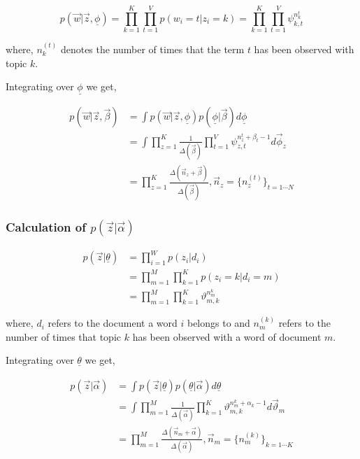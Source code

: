 \begin{equation}\label{eqn:wgivenpsi}
 p(\vec{w}|\vec{z},\underline{\phi}) = \prod_{k=1}^{K} \prod_{t=1}^{V} p(w_i=t|z_i=k) = \prod_{k=1}^{K} \prod_{t=1}^{V} \psi_{k,t}^{n_{k}^{t}}
\end{equation}

where, \(n_k^{(t)}\) denotes the number of times that the term \(t\) has been observed with topic \(k\).

Integrating  over \(\underline{\phi}\) we get,

\begin{align}
  p(\vec{w}|\vec{z},\vec{\beta})	& = \int p(\vec{w}|\vec{z},\underline{\phi})p(\underline{\phi}|\vec{\beta})d\underline{\phi} \\
					& = \int \prod_{z=1}^{K} \frac{1}{\Delta(\vec{\beta})} \prod_{t=1}^{V} \psi_{z,t}^{n_{z}^{t}+\beta_t-1}d\vec{\phi}_z \\ 
					& = \prod_{z=1}^{K} \frac{\Delta(\vec{n}_z+\vec{\beta})}{\Delta(\vec{\beta})}, \vec{n}_z = \{n_{z}^{(t)}\}_{t=1 \cdots N}
					\label{eqn:wgivenbeta}
\end{align}

\subsubsection*{Calculation of \(p(\vec{z}|\vec{\alpha})\)}

\begin{align}
 p(\vec{z}|\underline{\theta})		& = \prod_{i=1}^{W} p(z_i|d_i) \\
					& = \prod_{m=1}^{M} \prod_{k=1}^{K} p(z_i=k|d_i=m) \\
					& = \prod_{m=1}^{M} \prod_{k=1}^{K} \vartheta_{m,k}^{n_m^{k}} \label{eqn:zgiventheta}
\end{align}

where, \(d_i\) refers to the document a word \(i\) belongs to and \(n_m^{(k)}\) refers to the number of times that topic \(k\) has been observed
with a word of document \(m\).

Integrating  over \(\underline{\theta}\) we get,

\begin{align}
 p(\vec{z}|\vec{\alpha})		& = \int p(\vec{z}|\underline{\theta})p(\underline{\theta}|\vec{\alpha})d\underline{\theta} \\
					& = \int \prod_{m=1}^{M} \frac{1}{\Delta(\vec{\alpha})} \prod_{k=1}^{K} \vartheta_{m,k}^{n_m^{k} + \alpha_k - 1} d\vec{\vartheta}_m \\
					& = \prod_{m=1}^{M} \frac{\Delta(\vec{n}_m+\vec{\alpha})}{\Delta(\vec{\alpha})}, \vec{n}_m = \{n_{m}^{(k)}\}_{k=1 \cdots K}
					\label{eqn:zgivenalpha}
\end{align}

